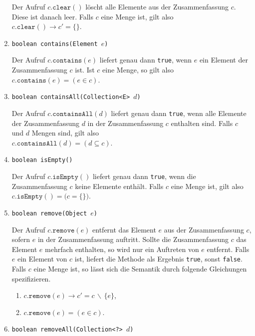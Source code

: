 \begin{enumerate}
      Der Aufruf $c.\mathtt{clear}()$ l\"oscht alle Elemente aus der Zusammenfassung
      $c$.  Diese ist danach leer.  Falls $c$ eine Menge ist, gilt also
      \\[0.2cm]
      \hspace*{1.3cm} $c.\mathtt{clear}() \rightarrow c' = \{\}$.
\item \texttt{boolean contains(Element $e$)}

      Der Aufruf $c.\mathtt{contains}(e)$ liefert genau dann \texttt{true}, wenn
      $e$ ein Element der Zusammenfassung $c$ ist.  Ist $c$ eine Menge, so gilt also
      \\[0.2cm]
      \hspace*{1.3cm}
      $c.\mathtt{contains}(e) = (e \in c)$.
     
\item \texttt{boolean containsAll(Collection<E> $d$)}
        
      Der Aufruf $c.\mathtt{containsAll}(d)$ liefert genau dann \texttt{true}, wenn alle
      Elemente der Zusammenfassung $d$ in der Zusammenfassung $c$ enthalten sind.
      Falls $c$ und $d$ Mengen sind, gilt also
      \\[0.2cm]
      \hspace*{1.3cm}
      $c.\mathtt{containsAll}(d) = (d \subseteq c)$.
      
\item \texttt{boolean isEmpty()}

      Der Aufruf $c.\mathtt{isEmpty}()$ liefert genau dann \texttt{true}, wenn die
      Zusammenfassung $c$ keine Elemente enth\"alt.  Falls $c$ eine Menge ist, gilt also
      \\[0.2cm]
      \hspace*{1.3cm}
      $c.\mathtt{isEmpty}() = \bigl(c = \{\}\bigr)$.
\item \texttt{boolean remove(Object $e$)}

      Der Aufruf $c.\mathtt{remove}(e)$ entfernt das Element $e$ aus der Zusammenfassung
      $c$, sofern $e$ in der Zusammenfassung auftritt.  Sollte die Zusammenfassung $c$ das
      Element $e$ mehrfach enthalten, so wird nur ein Auftreten von $e$ entfernt.
      Falls $e$ ein Element von $c$ ist, liefert die Methode als Ergebnis \texttt{true},
      sonst \texttt{false}.
      Falls $c$ eine Menge ist, so l\"asst sich die Semantik durch folgende Gleichungen
      spezifizieren.
      \begin{enumerate}
      \item $c.\mathtt{remove}(e) \rightarrow c' = c \,\backslash\, \{ e \}$,
      \item $c.\mathtt{remove}(e) = (e \in c)$.
      \end{enumerate}
\item \texttt{boolean removeAll(Collection<?> $d$)}


\end{enumerate}
